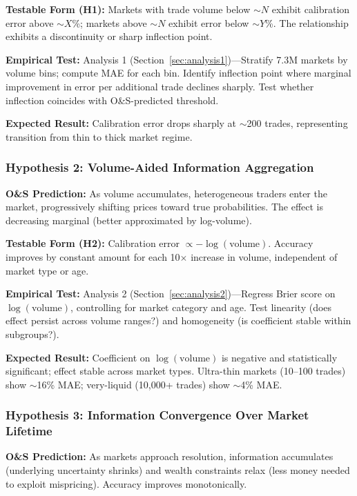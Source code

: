 \documentclass[12pt,letterpaper]{article}
\begin{document}
\textbf{Testable Form (H1):} Markets with trade volume below $\sim N$ exhibit calibration error above $\sim X$\%; markets above $\sim N$ exhibit error below $\sim Y$\%. The relationship exhibits a discontinuity or sharp inflection point.

\textbf{Empirical Test:} Analysis 1 (Section~\ref{sec:analysis1})---Stratify 7.3M markets by volume bins; compute MAE for each bin. Identify inflection point where marginal improvement in error per additional trade declines sharply. Test whether inflection coincides with O\&S-predicted threshold.

\textbf{Expected Result:} Calibration error drops sharply at $\sim$200 trades, representing transition from thin to thick market regime.

\subsubsection{Hypothesis 2: Volume-Aided Information Aggregation}

\textbf{O\&S Prediction:} As volume accumulates, heterogeneous traders enter the market, progressively shifting prices toward true probabilities. The effect is decreasing marginal (better approximated by log-volume).

\textbf{Testable Form (H2):} Calibration error $\propto -\log(\text{volume})$. Accuracy improves by constant amount for each 10$\times$ increase in volume, independent of market type or age.

\textbf{Empirical Test:} Analysis 2 (Section~\ref{sec:analysis2})---Regress Brier score on $\log(\text{volume})$, controlling for market category and age. Test linearity (does effect persist across volume ranges?) and homogeneity (is coefficient stable within subgroups?).

\textbf{Expected Result:} Coefficient on $\log(\text{volume})$ is negative and statistically significant; effect stable across market types. Ultra-thin markets (10--100 trades) show $\sim$16\% MAE; very-liquid (10,000+ trades) show $\sim$4\% MAE.

\subsubsection{Hypothesis 3: Information Convergence Over Market Lifetime}

\textbf{O\&S Prediction:} As markets approach resolution, information accumulates (underlying uncertainty shrinks) and wealth constraints relax (less money needed to exploit mispricing). Accuracy improves monotonically.
\end{document}
